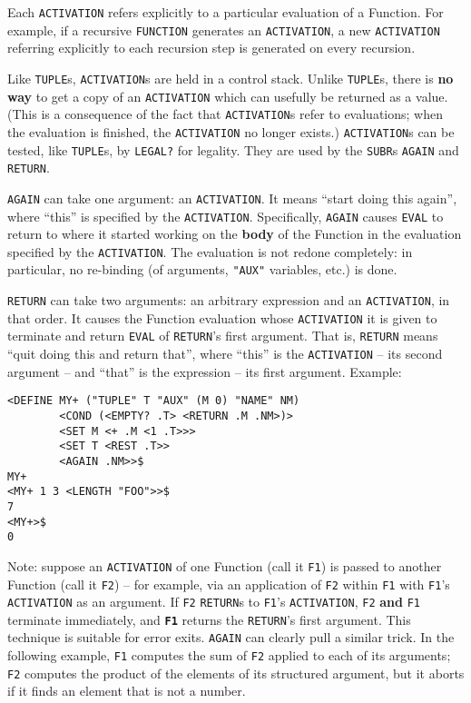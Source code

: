 \documentclass[a4paper]{scrbook}
\begin{document}
Each \texttt{ACTIVATION} refers explicitly to a particular evaluation of a Function. For example, if a recursive
\texttt{FUNCTION} generates an \texttt{ACTIVATION}, a new \texttt{ACTIVATION} referring explicitly to each recursion step
is generated on every recursion.

Like \texttt{TUPLE}s, \texttt{ACTIVATION}s are held in a control stack. Unlike \texttt{TUPLE}s, there is \textbf{no way} to
get a copy of an \texttt{ACTIVATION} which can usefully be returned as a value. (This is a consequence of the fact that
\texttt{ACTIVATION}s refer to evaluations; when the evaluation is finished, the \texttt{ACTIVATION} no longer exists.)
\texttt{ACTIVATION}s can be tested, like \texttt{TUPLE}s, by \texttt{LEGAL?} for legality. They are
used by the \texttt{SUBR}s \texttt{AGAIN} and \texttt{RETURN}.

\texttt{AGAIN} can take one argument: an \texttt{ACTIVATION}. It means ``start doing this again'', where ``this'' is
specified by the \texttt{ACTIVATION}. Specifically, \texttt{AGAIN} causes \texttt{EVAL} to return to where it started
working on the \textbf{body} of the Function in the evaluation specified by the \texttt{ACTIVATION}. The evaluation is not
redone completely: in particular, no re-binding (of arguments, \texttt{"AUX"} variables, etc.) is done.

 \texttt{RETURN} can take two arguments: an arbitrary expression and an \texttt{ACTIVATION},
in that order. It causes the Function evaluation whose \texttt{ACTIVATION} it is given to terminate and return
\texttt{EVAL} of \texttt{RETURN}'s first argument. That is, \texttt{RETURN} means ``quit doing this and return that'',
where ``this'' is the \texttt{ACTIVATION} -- its second argument -- and ``that'' is the expression -- its first argument.
Example:

\begin{verbatim}
<DEFINE MY+ ("TUPLE" T "AUX" (M 0) "NAME" NM)
        <COND (<EMPTY? .T> <RETURN .M .NM>)>
        <SET M <+ .M <1 .T>>>
        <SET T <REST .T>>
        <AGAIN .NM>>$
MY+
<MY+ 1 3 <LENGTH "FOO">>$
7
<MY+>$
0
\end{verbatim}

Note: suppose an \texttt{ACTIVATION} of one Function (call it \texttt{F1}) is passed to another Function (call it
\texttt{F2}) -- for example, via an application of \texttt{F2} within \texttt{F1} with \texttt{F1}'s \texttt{ACTIVATION} as
an argument. If \texttt{F2} \texttt{RETURN}s to \texttt{F1}'s \texttt{ACTIVATION}, \texttt{F2} \textbf{and} \texttt{F1}
terminate immediately, and \textbf{\texttt{F1}} returns the \texttt{RETURN}'s first argument. This technique is suitable
for error exits. \texttt{AGAIN} can clearly pull a similar trick. In the following example, \texttt{F1} computes the sum of
\texttt{F2} applied to each of its arguments; \texttt{F2} computes the product of the elements of its structured argument,
but it aborts if it finds an element that is not a number.
\end{document}
